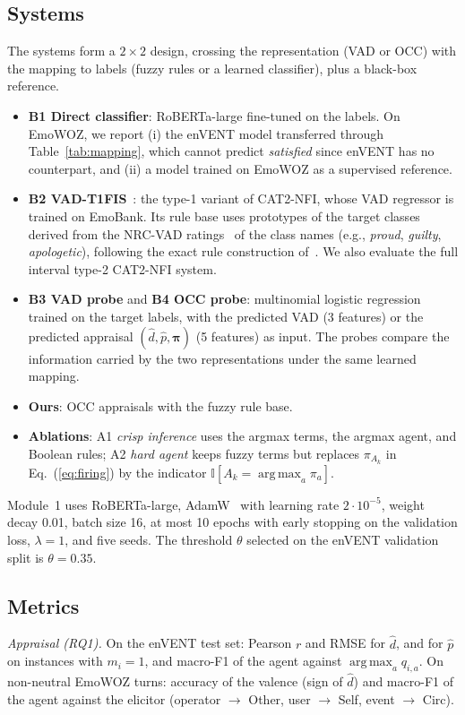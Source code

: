 \documentclass[conference, a4paper]{IEEEtran}
\DeclareMathOperator*{\argmax}{arg\,max}
\begin{document}
\subsection{Systems}
The systems form a $2 \times 2$ design, crossing the representation (VAD or OCC) with the mapping to labels (fuzzy rules or a learned classifier), plus a black-box reference.
\begin{itemize}
    \item \textbf{B1 Direct classifier}: RoBERTa-large fine-tuned on the labels. On EmoWOZ, we report (i) the enVENT model transferred through Table~\ref{tab:mapping}, which cannot predict \textit{satisfied} since enVENT has no counterpart, and (ii) a model trained on EmoWOZ as a supervised reference.
    \item \textbf{B2 VAD-T1FIS}~\cite{bensaid_cat2nfi}: the type-1 variant of CAT2-NFI, whose VAD regressor is trained on EmoBank. Its rule base uses prototypes of the target classes derived from the NRC-VAD ratings~\cite{mohammad2018obtaining} of the class names (e.g., \textit{proud}, \textit{guilty}, \textit{apologetic}), following the exact rule construction of~\cite{bensaid_cat2nfi}. We also evaluate the full interval type-2 CAT2-NFI system.
    \item \textbf{B3 VAD probe} and \textbf{B4 OCC probe}: multinomial logistic regression trained on the target labels, with the predicted VAD (3 features) or the predicted appraisal $(\hat d, \hat p, \boldsymbol{\pi})$ (5 features) as input. The probes compare the information carried by the two representations under the same learned mapping.
    \item \textbf{Ours}: OCC appraisals with the fuzzy rule base.
    \item \textbf{Ablations}: A1 \textit{crisp inference} uses the argmax terms, the argmax agent, and Boolean rules; A2 \textit{hard agent} keeps fuzzy terms but replaces $\pi_{A_k}$ in Eq.~(\ref{eq:firing}) by the indicator $\mathbb{I}[A_k = \argmax_a \pi_a]$.
\end{itemize}
Module~1 uses RoBERTa-large, AdamW~\cite{loshchilov2019decoupled} with learning rate $2 \cdot 10^{-5}$, weight decay 0.01, batch size 16, at most 10 epochs with early stopping on the validation loss, $\lambda = 1$, and five seeds. The threshold $\theta$ selected on the enVENT validation split is $\theta = 0.35$.

\subsection{Metrics}
\label{sec:metrics}
\textit{Appraisal (RQ1).} On the enVENT test set: Pearson $r$ and RMSE for $\hat d$, and for $\hat p$ on instances with $m_i = 1$, and macro-F1 of the agent against $\argmax_a q_{i,a}$. On non-neutral EmoWOZ turns: accuracy of the valence (sign of $\hat d$) and macro-F1 of the agent against the elicitor (operator $\rightarrow$ Other, user $\rightarrow$ Self, event $\rightarrow$ Circ).
\end{document}
